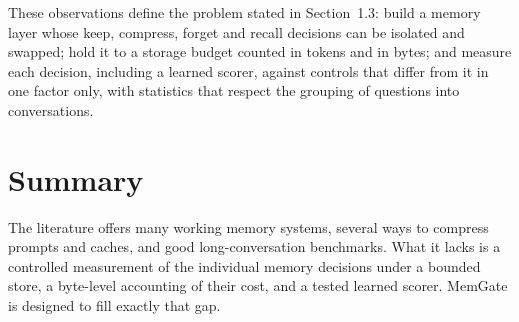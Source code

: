 These observations define the problem stated in Section~1.3: build a memory
layer whose keep, compress, forget and recall decisions can be isolated and
swapped; hold it to a storage budget counted in tokens and in bytes; and
measure each decision, including a learned scorer, against controls that
differ from it in one factor only, with statistics that respect the grouping
of questions into conversations.

\section*{Summary}
The literature offers many working memory systems, several ways to compress
prompts and caches, and good long-conversation benchmarks. What it lacks is a
controlled measurement of the individual memory decisions under a bounded
store, a byte-level accounting of their cost, and a tested learned scorer.
MemGate is designed to fill exactly that gap.
